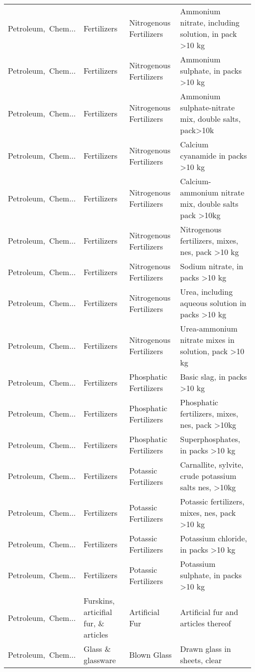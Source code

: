 \begin{appendices}
\begin{xltabular}{\textwidth}{|p{0.10\textwidth}|p{0.25\textwidth}|p{0.24\textwidth}|p{0.31\textwidth}|}
Petroleum,\ Chem... & Fertilizers & Nitrogenous Fertilizers & Ammonium nitrate, including solution, in pack >10 kg \\
Petroleum,\ Chem... & Fertilizers & Nitrogenous Fertilizers & Ammonium sulphate, in packs >10 kg \\
Petroleum,\ Chem... & Fertilizers & Nitrogenous Fertilizers & Ammonium sulphate-nitrate mix, double salts, pack>10k \\
Petroleum,\ Chem... & Fertilizers & Nitrogenous Fertilizers & Calcium cyanamide in packs >10 kg \\
Petroleum,\ Chem... & Fertilizers & Nitrogenous Fertilizers & Calcium-ammonium nitrate mix, double salts pack >10kg \\
Petroleum,\ Chem... & Fertilizers & Nitrogenous Fertilizers & Nitrogenous fertilizers, mixes, nes, pack >10 kg \\
Petroleum,\ Chem... & Fertilizers & Nitrogenous Fertilizers & Sodium nitrate, in packs >10 kg \\
Petroleum,\ Chem... & Fertilizers & Nitrogenous Fertilizers & Urea, including aqueous solution in packs >10 kg \\
Petroleum,\ Chem... & Fertilizers & Nitrogenous Fertilizers & Urea-ammonium nitrate mixes in solution, pack >10 kg \\
Petroleum,\ Chem... & Fertilizers & Phosphatic Fertilizers & Basic slag, in packs >10 kg \\
Petroleum,\ Chem... & Fertilizers & Phosphatic Fertilizers & Phosphatic fertilizers, mixes, nes, pack >10kg \\
Petroleum,\ Chem... & Fertilizers & Phosphatic Fertilizers & Superphosphates, in packs >10 kg \\
Petroleum,\ Chem... & Fertilizers & Potassic Fertilizers & Carnallite, sylvite, crude potassium salts nes, >10kg \\
Petroleum,\ Chem... & Fertilizers & Potassic Fertilizers & Potassic fertilizers, mixes, nes, pack >10 kg \\
Petroleum,\ Chem... & Fertilizers & Potassic Fertilizers & Potassium chloride, in packs >10 kg \\
Petroleum,\ Chem... & Fertilizers & Potassic Fertilizers & Potassium sulphate, in packs >10 kg \\
Petroleum,\ Chem... & Furskins, articifial fur, \& articles & Artificial Fur & Artificial fur and articles thereof \\
Petroleum,\ Chem... & Glass \& glassware & Blown Glass & Drawn glass in sheets, clear \\

\end{xltabular}
\end{appendices}
